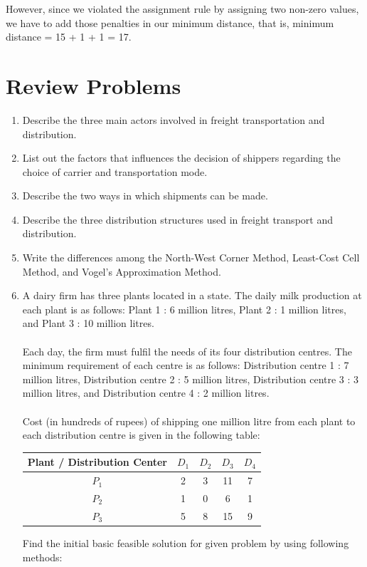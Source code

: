 However, since we violated the assignment rule by assigning two non-zero values, we have to add those penalties in our minimum distance, that is, minimum distance = 15 + 1 + 1 = 17.
%
\section{Review Problems}
\begin{enumerate}
	\item Describe the three main actors involved in freight transportation and distribution.
	\item List out the factors that influences the decision of shippers regarding the choice of carrier and transportation mode.
	\item Describe the two ways in which shipments can be made.
	\item Describe the three distribution structures used in freight transport and distribution.
	\item Write the differences among the North-West Corner Method, Least-Cost Cell Method, and Vogel's Approximation Method.
	\item A dairy firm has three plants located in a state. The daily milk production at each plant is as follows: Plant 1 : 6 million litres, Plant 2 : 1 million litres, and Plant 3 : 10 million litres.\\\\
	Each day, the firm must fulfil the needs of its four distribution centres. The minimum requirement of each centre is as follows: Distribution centre 1 : 7 million litres, Distribution centre 2 : 5 million litres, Distribution centre 3 : 3 million litres, and Distribution centre 4 : 2 million litres.\\\\
	Cost (in hundreds of rupees) of shipping one million litre from each plant to each distribution centre is given
	in the following table:
		\begin{center}
			\begin{tabular}{c | c | c | c | c}
				Plant / Distribution Center & $D_1$ & $D_2$ & $D_3$ & $D_4$\\
				\hline
				$P_1$ & 2 & 3 & 11 & 7\\
				\hline
				$P_2$ & 1 & 0 & 6 & 1 \\
				\hline
				$P_3$ & 5 & 8 & 15 & 9
			\end{tabular}
		\end{center}
	Find the initial basic feasible solution for given problem by using following methods:

\end{enumerate}

